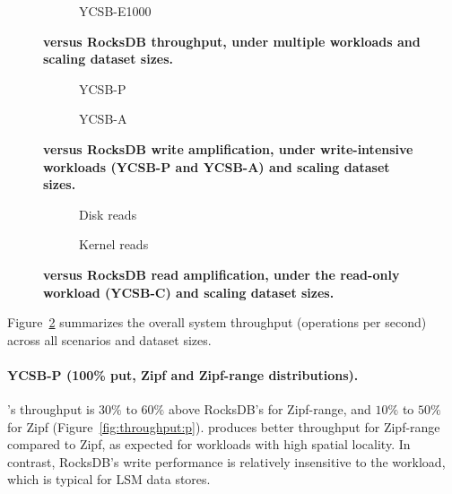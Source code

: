 \begin{figure}[tb]
\begin{subfigure}{0.3\linewidth}
\caption{YCSB-E1000}
\label{fig:throughput:e1000}
\end{subfigure}
\caption{\bf{\sys\/ versus RocksDB throughput, under multiple workloads and scaling dataset sizes.}}
\label{fig:throughput}
\end{figure}

\begin{figure}
\centering
\hspace{0.05\linewidth}
\begin{subfigure}{0.3\linewidth}
\caption{YCSB-P}
\label{fig:writeamp:p}
\end{subfigure}
\hspace{0.05\linewidth}
\begin{subfigure}{0.25\linewidth}
\caption{YCSB-A}
\label{fig:writeamp:a}
\end{subfigure}
\caption{\bf{\sys\/ versus RocksDB write amplification, under write-intensive workloads (YCSB-P and YCSB-A) and scaling dataset sizes.}}
\label{fig:writeamp}
\end{figure}

\begin{figure}
\centering
\hspace{0.05\linewidth}
\begin{subfigure}{0.3\linewidth}
\caption{Disk reads}
\label{fig:readamp:d}
\end{subfigure}
\hspace{0.05\linewidth}
\begin{subfigure}{0.25\linewidth}
\caption{Kernel reads}
\label{fig:readamp:k}
\end{subfigure}
\caption{\bf{\sys\/ versus RocksDB read amplification, under the read-only workload (YCSB-C) and scaling dataset sizes.}}
\label{fig:readamp}
\end{figure}

Figure~\ref{fig:throughput} summarizes the overall system throughput (operations per second) 
across all scenarios and dataset sizes. 

\paragraph{YCSB-P (100\% put, Zipf and Zipf-range distributions).} 
\sys's throughput is $30\%$ to $60\%$ above RocksDB's for Zipf-range, 
and $10\%$ to $50\%$ for Zipf (Figure~\ref{fig:throughput:p}). 
\sys\/ produces better throughput for Zipf-range compared to Zipf, 
as expected for workloads with high spatial locality. In contrast, 
RocksDB's write performance is relatively insensitive to the workload, 
which is typical for LSM data stores.

